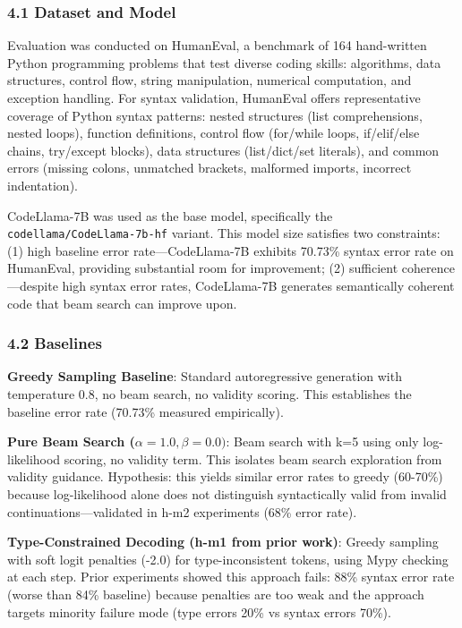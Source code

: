 
\subsubsection{4.1 Dataset and Model}

Evaluation was conducted on HumanEval, a benchmark of 164 hand-written Python programming problems that test diverse coding skills: algorithms, data structures, control flow, string manipulation, numerical computation, and exception handling. For syntax validation, HumanEval offers representative coverage of Python syntax patterns: nested structures (list comprehensions, nested loops), function definitions, control flow (for/while loops, if/elif/else chains, try/except blocks), data structures (list/dict/set literals), and common errors (missing colons, unmatched brackets, malformed imports, incorrect indentation).

CodeLlama-7B was used as the base model, specifically the \texttt{codellama/CodeLlama-7b-hf} variant. This model size satisfies two constraints: (1) high baseline error rate---CodeLlama-7B exhibits 70.73\% syntax error rate on HumanEval, providing substantial room for improvement; (2) sufficient coherence---despite high syntax error rates, CodeLlama-7B generates semantically coherent code that beam search can improve upon.

\subsubsection{4.2 Baselines}

\textbf{Greedy Sampling Baseline}: Standard autoregressive generation with temperature 0.8, no beam search, no validity scoring. This establishes the baseline error rate (70.73\% measured empirically).

\textbf{Pure Beam Search ($\alpha =1.0, \beta =0.0)$}: Beam search with k=5 using only log-likelihood scoring, no validity term. This isolates beam search exploration from validity guidance. Hypothesis: this yields similar error rates to greedy (60-70\%) because log-likelihood alone does not distinguish syntactically valid from invalid continuations---validated in h-m2 experiments (68\% error rate).

\textbf{Type-Constrained Decoding (h-m1 from prior work)}: Greedy sampling with soft logit penalties (-2.0) for type-inconsistent tokens, using Mypy checking at each step. Prior experiments showed this approach fails: 88\% syntax error rate (worse than 84\% baseline) because penalties are too weak and the approach targets minority failure mode (type errors 20\% vs syntax errors 70\%).

